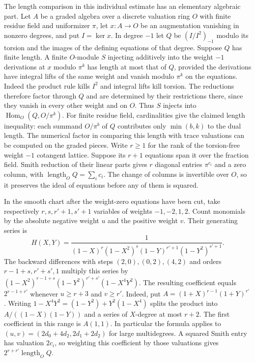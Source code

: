 \documentclass[11pt]{amsart}
\theoremstyle{definition}
\theoremstyle{remark}
\begin{document}
The length comparison in this individual estimate has an elementary
algebraic part. Let $A$ be a graded algebra over a discrete valuation
ring $O$ with finite residue field and uniformizer $\pi$, let $x:A\to O$ be an augmentation
vanishing in nonzero degrees, and put $I=\ker x$. In degree $-1$
let $Q$ be $(I/I^2)_{-1}$ modulo its torsion and the images of
the defining equations of that degree. Suppose $Q$
has finite length. A finite $O$-module $S$ injecting additively
into the weight $-1$ derivations at $x$ modulo $\pi^k$ has length
at most that of $Q$, provided the derivations have integral lifts
of the same weight and vanish modulo $\pi^k$ on the equations.
Indeed the product rule kills $I^2$ and integral lifts kill torsion.
The reductions therefore factor through $Q$ and are determined by
their restrictions there, since they vanish in every other weight
and on $O$. Thus $S$ injects into
$\operatorname{Hom}_O(Q,O/\pi^k)$. For finite residue field,
cardinalities give the claimed length inequality: each summand
$O/\pi^b$ of $Q$ contributes only $\min(b,k)$ to the dual length.
The numerical factor in comparing this length with trace valuations
can be computed on the graded pieces. Write $r\ge1$ for the rank of
the torsion-free weight $-1$ cotangent lattice. Suppose its $r+1$
equations span it over the fraction field. Smith reduction of their
linear parts gives $r$ diagonal entries $\pi^{c_i}$ and a zero
column, with $\operatorname{length}_O Q=\sum_i c_i$. The change
of columns is invertible over $O$, so it preserves the ideal of
equations before any of them is squared.

In the smooth chart after the weight-zero equations have been cut,
take respectively $r,s,r'+1,s'+1$ variables of weights $-1,-2,1,2$.
Count monomials by the absolute negative weight $u$ and the positive
weight $v$. Their generating series is
\[
 H(X,Y)=\frac{1}{(1-X)^r(1-X^2)^s(1-Y)^{r'+1}(1-Y^2)^{s'+1}}.
\]
The backward differences with steps $(2,0),(0,2),(4,2)$ and
orders $r-1+s,r'+s',1$ multiply this series by
$(1-X^2)^{r-1+s}(1-Y^2)^{r'+s'}(1-X^4Y^2)$.
The resulting coefficient equals $2^{r-1+r'}$ whenever
$u\ge r+3$ and $v\ge r'$. Indeed, put $A=(1+X)^{r-1}(1+Y)^{r'}$.
Writing $1-X^4Y^2=(1-Y^2)+Y^2(1-X^4)$ splits the product into
$A/((1-X)(1-Y))$ and a series of $X$-degree at most $r+2$.
The first coefficient in this range is $A(1,1)$. In particular
the formula applies to $(u,v)=(2d_0+4d_2,2d_1+2d_2)$ for large
multidegrees. A squared Smith entry has valuation $2c_i$, so
weighting this coefficient by those valuations gives
$2^{r+r'}\operatorname{length}_O Q$.
\end{document}
